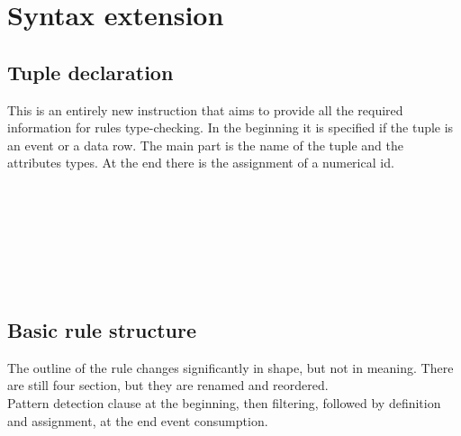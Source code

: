 \section{Syntax extension}

\subsection{Tuple declaration}
This is an entirely new instruction that aims to provide all the required information for rules type-checking. In the beginning it is specified if the tuple is an event or a data row. The main part is the name of the tuple and the attributes types. At the end there is the assignment of a numerical id.
\begin{bnf*}
\\
\\
\\
\\
\\
\\
\end{bnf*}

\subsection{Basic rule structure}
The outline of the rule changes significantly in shape, but not in meaning. There are still four section, but they are renamed and reordered.\\
Pattern detection clause at the beginning, then filtering, followed by definition and assignment, at the end event consumption. 
\begin{bnf*}
\end{bnf*}

